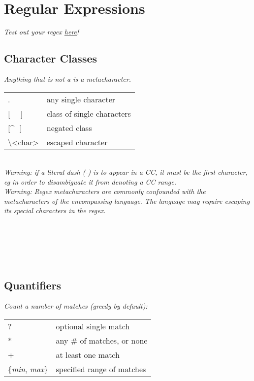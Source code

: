 \section{Regular Expressions}

\textit{Test out your regex \href{https://regex101.com/}{here}!}

\subsection*{Character Classes}

\textit{Anything that is not a  is a metacharacter.}
\begin{tabular}{l  l}
    .           & any single character \\
    {[ \,\,\,\, ]}  & class of single characters \\
    {[\textasciicircum \,\, ]}  & negated class \\
    \textbackslash <char>   & escaped character \\
\end{tabular} \\[1mm]
\textit{{\color{red}Warning:} if a literal dash (-) is to appear in a CC, it must be the first character, eg }\textit{ in order to disambiguate it from denoting a CC range.}\\[1mm]
\textit{{\color{red}Warning:} Regex metacharacters are commonly confounded with the metacharacters of the encompassing language. The language may require escaping its special characters in the regex.}\\[1mm]
\\
\\
\\
\\
\\


\subsection*{Quantifiers}
\textit{Count a number of matches (greedy by default):} \\
\begin{tabular}{l  l}
    ?  & optional single match \\
    *  & any \# of matches, or none \\
    +  & at least one match \\
    \{\textit{\footnotesize min}, \textit{\footnotesize max}\}  & specified range of matches \\
\end{tabular}

